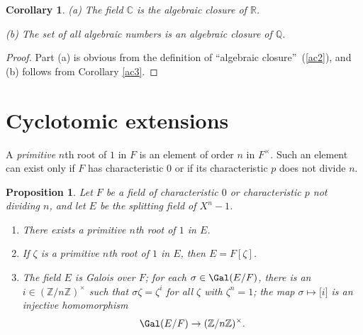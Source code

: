 \documentclass[a4paper,11pt,final,openany]{memoir}
\newtheorem{corollary}[X]{Corollary}
\newtheorem{proposition}[X]{Proposition}
\theoremstyle{nonumberplain}
\newtheorem{proof}{Proof.}
\begin{document}
\begin{corollary}
\label{ag6}(a) The field $\mathbb{C}$ is the algebraic closure of $\mathbb{R}
$.

(b) The set of all algebraic numbers is an algebraic closure of $\mathbb{Q}.$
\end{corollary}

\begin{proof}
Part (a) is obvious from the definition of \textquotedblleft algebraic
closure\textquotedblright\ (\ref{ac2}), and (b) follows from Corollary
\ref{ac3}.
\end{proof}

\section{Cyclotomic extensions}

A \emph{primitive} $n$th root%
of $1$ in $F$ is an element of order $n$ in $F^{\times}$. Such an element can
exist only if $F$ has characteristic $0$ or if its characteristic $p$ does not
divide $n$.

\begin{proposition}
\label{ag7} Let $F$ be a field of characteristic $0$ or characteristic $p$ not
dividing $n$, and let $E$ be the splitting field of $X^{n}-1$.

\begin{enumerate}
\item There exists a primitive $n$th root of $1$ in $E$.

\item If $\zeta$ is a primitive $n$th root of $1$ in $E$, then $E=F[\zeta]$.

\item The field $E$ is Galois over $F$; for each $\sigma\in\Gal(E/F)$, there
is an $i\in(\mathbb{Z}{}/n\mathbb{Z}{})^{\times}$ such that $\sigma\zeta
=\zeta^{i}$ for all $\zeta$ with $\zeta^{n}=1$; the map $\sigma\mapsto\lbrack
i]$ is an injective homomorphism
\[
\Gal(E/F)\rightarrow(\mathbb{Z}/n\mathbb{Z})^{\times}\text{.}%
\]

\end{enumerate}
\end{proposition}
\end{document}
